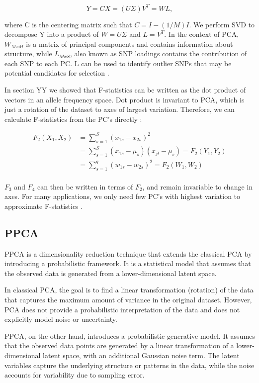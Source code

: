 \documentclass[12pt, letterpaper]{article}
\begin{document}
$$Y = CX = (U\Sigma ) V^T = WL,$$

where C is the centering matrix such that $C = I - (1/M)I$. We perform SVD to decompose Y into a product of $W = U\Sigma$ and $L = V^T$. In the context of PCA, $W_{MxM}$ is a matrix of principal components and contains information about structure, while $L_{MxS}$, also known as SNP loadings contains the contribution of each SNP to each PC. L can be used to identify outlier SNPs that may be potential candidates for selection \cite{gower_distance_1966}. 

In section YY we showed that F-statistics can be written as the dot product of vectors in an allele frequency space. Dot product is invariant to PCA, which is just a rotation of the dataset to axes of largest variation. Therefore, we can calculate F-statistics from the PC's directly \cite{peter_geometric_2022}:

\begin{align}\label{eq:f_intro}
F_2(X_1,X_2) &= \sum_{s=1}^S(x_{1s} - x_{2s})^2\nonumber\\
&= \sum_{s=1}^S(x_{1s} - \mu_s)(x_{jl} - \mu_s) = F_2(Y_1,Y_2)\nonumber\\
&= \sum_{s=1}^q(w_{1s} - w_{2s})^2 = F_2(W_1,W_2)\nonumber\\
\end{align}

$F_3$ and $F_4$ can then be written in terms of $F_2$, and remain invariable to change in axes. For many applications, we only need few PC's with highest variation to approximate F-statistics \cite{peter_geometric_2022}. 

\subsection{PPCA}

PPCA is a dimensionality reduction technique that extends the classical PCA by introducing a probabilistic framework. It is a statistical model that assumes that the observed data is generated from a lower-dimensional latent space.

In classical PCA, the goal is to find a linear transformation (rotation) of the data that captures the maximum amount of variance in the original dataset. However, PCA does not provide a probabilistic interpretation of the data and does not explicitly model noise or uncertainty.

PPCA, on the other hand, introduces a probabilistic generative model. It assumes that the observed data points are generated by a linear transformation of a lower-dimensional latent space, with an additional Gaussian noise term. The latent variables capture the underlying structure or patterns in the data, while the noise accounts for variability due to sampling error.
\end{document}
